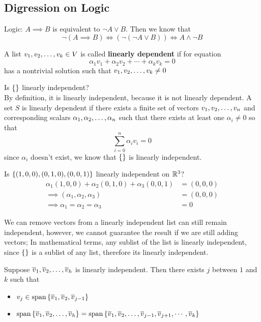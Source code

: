 \subsection*{Digression on Logic}
Logic: $A \implies B$ is equivalent to $\neg A \lor B$. Then we know that \[\neg (A \implies B) \iff (\neg(\neg A \lor B)) \iff A \land \neg B\]
\begin{definition}
    A list ${v}_1,{v}_2, \ldots, {v}_{k} \in V$ is called \textbf{linearly dependent} if for equation
    \[ \alpha_1 v_1 + \alpha_2 v_2 + \cdots + \alpha_k v_k = 0\] has a nontrivial solution such that ${v}_1,{v}_2, \ldots, {v}_{k} \neq 0$
\end{definition}
\begin{example}
    Is $\left\{ \right\}$ linearly independent? \\
    By definition, it is linearly independent, because it is not linearly dependent. A set $S$ is linearly dependent if there exists a finite set of vectors ${v}_1,{v}_2, \ldots, {v}_{n}$ and corresponding scalars ${\alpha}_1,{\alpha}_2, \ldots, {\alpha}_{n}$ such that there exists at least one $\alpha_i \neq 0$ so that \[ \sum_{i= 0}^n \alpha_i v_i = 0\] since $\alpha_i$ doesn't exist, we know that $\left\{ \right\}$ is linearly independent.
\end{example}
\begin{example}
    Is $\left\{ (1,0,0),(0,1,0),(0,0,1)\right\}$ linearly independent on $\mathbb R^3$?
    \begin{align*}
        \alpha_1(1,0,0) + \alpha_2(0,1,0) + \alpha_3(0,0,1) &= (0,0,0) \\
        \implies (\alpha_1, \alpha_2, \alpha_3) &= (0,0,0) \\
        \implies \alpha_1 = \alpha_2 = \alpha_3 &= 0
    \end{align*}    
\end{example}
\begin{remark}
    We can remove vectors from a linearly independent list can still remain independent, however, we cannot guarantee the result if we are still adding vectors; In mathematical terms, any sublist of the list is linearly independent, since $\left\{ \right\}$ is a sublist of any list, therefore its linearly independent.
\end{remark}
\begin{lemma}
    Suppose ${\overline v}_1,{\overline v}_2, \ldots, {\overline v}_{h}$ is linearly independent. Then there exists $j$ between $1$ and $k$ such that 
    \begin{itemize}
        \item $v_j \in \text{span} \left\{ \overline v_1, \overline v_2, \overline v_{j-1} \right\}$
        \item $\text{span} \left\{ {\overline v}_1,{\overline v}_2, \ldots, {\overline v}_{h} \right\} = \text{span} \left\{ {\overline v}_1,{\overline v}_2, \ldots, {\overline v}_{j-1}, \overline v_{j+1} , \cdots, \overline v_k \right\}$
    \end{itemize}
\end{lemma}

